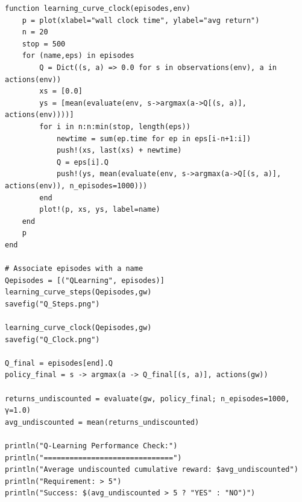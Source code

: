 \documentclass[11pt]{article}
\begin{document}
\begin{lstlisting}
function learning_curve_clock(episodes,env)
	p = plot(xlabel="wall clock time", ylabel="avg return")
	n = 20 
	stop = 500
	for (name,eps) in episodes
	    Q = Dict((s, a) => 0.0 for s in observations(env), a in actions(env))
	    xs = [0.0]
	    ys = [mean(evaluate(env, s->argmax(a->Q[(s, a)], actions(env))))]
	    for i in n:n:min(stop, length(eps))
	        newtime = sum(ep.time for ep in eps[i-n+1:i])
	        push!(xs, last(xs) + newtime)
	        Q = eps[i].Q
	        push!(ys, mean(evaluate(env, s->argmax(a->Q[(s, a)], actions(env)), n_episodes=1000)))
	    end    
	    plot!(p, xs, ys, label=name)
	end
	p
end

# Associate episodes with a name
Qepisodes = [("QLearning", episodes)]
learning_curve_steps(Qepisodes,gw)
savefig("Q_Steps.png")

learning_curve_clock(Qepisodes,gw)
savefig("Q_Clock.png")

Q_final = episodes[end].Q
policy_final = s -> argmax(a -> Q_final[(s, a)], actions(gw))

returns_undiscounted = evaluate(gw, policy_final; n_episodes=1000, γ=1.0)
avg_undiscounted = mean(returns_undiscounted)

println("Q-Learning Performance Check:")
println("==============================")
println("Average undiscounted cumulative reward: $avg_undiscounted")
println("Requirement: > 5")
println("Success: $(avg_undiscounted > 5 ? "YES" : "NO")")

\end{lstlisting}
\end{document}
